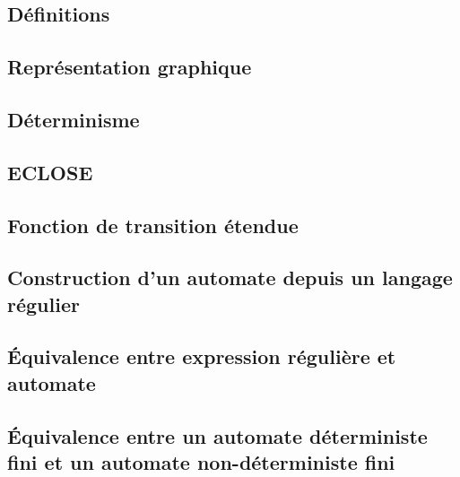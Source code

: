 \subsection{Définitions}
\subsection{Représentation graphique}
\subsection{Déterminisme}
\subsection{ECLOSE}
\subsection{Fonction de transition étendue}
\subsection{Construction d'un automate depuis un langage régulier}
\subsection{Équivalence entre expression régulière et automate}
\subsection{Équivalence entre un automate déterministe fini et un automate non-déterministe fini}
